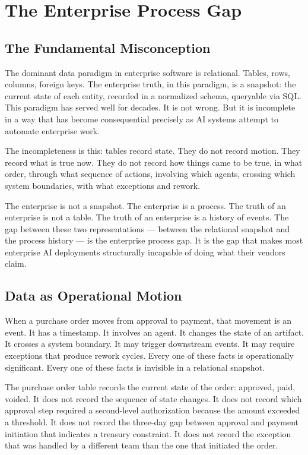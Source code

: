 \chapter{The Enterprise Process Gap}
\label{chap:enterprise_gap}

\section{The Fundamental Misconception}

The dominant data paradigm in enterprise software is relational. Tables, rows, columns, foreign keys. The enterprise truth, in this paradigm, is a snapshot: the current state of each entity, recorded in a normalized schema, queryable via SQL. This paradigm has served well for decades. It is not wrong. But it is incomplete in a way that has become consequential precisely as AI systems attempt to automate enterprise work.

The incompleteness is this: tables record state. They do not record motion. They record what is true now. They do not record how things came to be true, in what order, through what sequence of actions, involving which agents, crossing which system boundaries, with what exceptions and rework.

The enterprise is not a snapshot. The enterprise is a process. The truth of an enterprise is not a table. The truth of an enterprise is a history of events. The gap between these two representations --- between the relational snapshot and the process history --- is the enterprise process gap. It is the gap that makes most enterprise AI deployments structurally incapable of doing what their vendors claim.

\section{Data as Operational Motion}

When a purchase order moves from approval to payment, that movement is an event. It has a timestamp. It involves an agent. It changes the state of an artifact. It crosses a system boundary. It may trigger downstream events. It may require exceptions that produce rework cycles. Every one of these facts is operationally significant. Every one of these facts is invisible in a relational snapshot.

The purchase order table records the current state of the order: approved, paid, voided. It does not record the sequence of state changes. It does not record which approval step required a second-level authorization because the amount exceeded a threshold. It does not record the three-day gap between approval and payment initiation that indicates a treasury constraint. It does not record the exception that was handled by a different team than the one that initiated the order.

